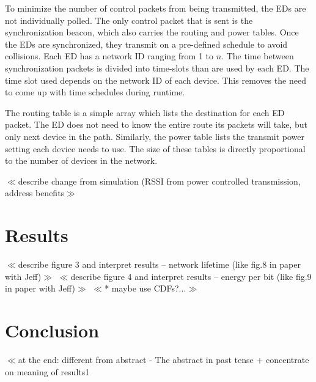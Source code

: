 \documentclass{article}
\begin{document}
To minimize the number of control packets from being transmitted, the EDs are not individually polled. The only control packet that is sent is the synchronization beacon, which also carries the routing and power tables. Once the EDs are synchronized, they transmit on a pre-defined schedule to avoid collisions. Each ED has a network ID ranging from 1 to $n$. The time between synchronization packets is divided into time-slots than are used by each ED. The time slot used depends on the network ID of each device. This removes the need to come up with time schedules during runtime.

The routing table is a simple array which lists the destination for each ED packet. The ED does not need to know the entire route its packets will take, but only next device in the path. Similarly, the power table lists the transmit power setting each device needs to use. The size of these tables is directly proportional to the number of devices in the network.

$\ll$describe change from simulation (RSSI from power controlled transmission, address benefits$\gg$

\section{Results}
$\ll$describe figure  3 and interpret results – network lifetime (like fig.8 in paper with Jeff)$\gg$ 
$\ll$describe figure  4 and interpret results – energy per bit (like fig.9 in paper with Jeff)$\gg$ 
$\ll$* maybe use CDFs?...$\gg$

\section{Conclusion}
$\ll$at the end: different from abstract -  The abstract in past tense + concentrate on meaning of results1

{}

\end{document}
